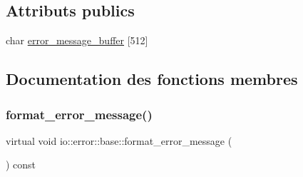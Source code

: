 \subsection*{Attributs publics}
\begin{DoxyCompactItemize}
\item 
char \hyperlink{structio_1_1error_1_1base_a3be516c4636b7b61133968cb8081c885}{error\+\_\+message\+\_\+buffer} \mbox{[}512\mbox{]}
\end{DoxyCompactItemize}


\subsection{Documentation des fonctions membres}
\mbox{\label{structio_1_1error_1_1base_a7d9ff6a31b716a24f056cf8a3e15191d}} 
\subsubsection{\texorpdfstring{format\+\_\+error\+\_\+message()}{format\_error\_message()}}
{\footnotesize\ttfamily virtual void io\+::error\+::base\+::format\+\_\+error\+\_\+message (\begin{DoxyParamCaption}{ }\end{DoxyParamCaption}) const\hspace{0.3cm}{\ttfamily [pure virtual]}}



